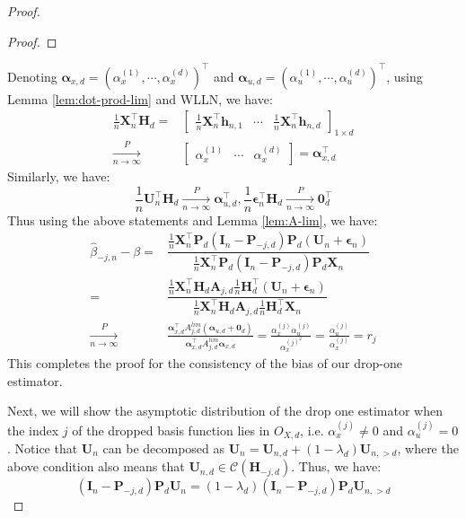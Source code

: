 \documentclass[
  12pt]{article}
\newcommand{\pnlim}{\xrightarrow[n \to \infty]{P}}
\newcommand{\bX}{\boldsymbol{X}}
\newcommand{\bh}{\boldsymbol{h}}
\newcommand{\balp}{\boldsymbol{\alpha}}
\newcommand{\bA}{\boldsymbol{A}}
\newcommand{\bU}{\boldsymbol{U}}
\newcommand{\bP}{\boldsymbol{P}}
\newcommand{\bI}{\boldsymbol{I}}
\newcommand{\beps}{\boldsymbol{\epsilon}}
\newcommand{\colsp}{\mathscr{C}}
\newcommand{\bH}{\boldsymbol{H}}
\newcommand{\bzero}{\boldsymbol{0}}
\begin{document}
\begin{proof}
\begin{proof}
\end{proof}
Denoting $\balp_{x,d} = \left(\alpha^{(1)}_{x}, \cdots, \alpha^{(d)}_{x}\right)^\top$ and $\balp_{u,d} = \left(\alpha^{(1)}_{u}, \cdots, \alpha^{(d)}_{u}\right)^\top$, using Lemma \ref{lem:dot-prod-lim} and WLLN, we have:
\begin{equation}\label{eq:X-Hk-inner}
    \begin{split}
           \frac{1}{n}\bX_n^\top\bH_d = & \begin{bmatrix}
        \frac{1}{n}\bX_n^\top\bh_{n,1} & \cdots & \frac{1}{n}\bX_n^\top\bh_{n,d}
    \end{bmatrix}_{1 \times d}\\
    \pnlim & \begin{bmatrix}
        \alpha_x^{(1)} & \cdots & \alpha_x^{(d)}
    \end{bmatrix} = \balp_{x,d}^\top
    \end{split}
\end{equation}
Similarly, we have:
$$
    \frac{1}{n}\bU_n^\top\bH_d \pnlim\balp_{u,d}^\top, \frac{1}{n}\beps_n^\top\bH_d \pnlim\bzero_{d}^\top
$$
Thus using the above statements and Lemma \ref{lem:A-lim}, we have:
\begin{equation}
    \begin{split}
        \hat{\beta}_{-j,n} - \beta = &\dfrac{\frac{1}{n}{\bX}_{n}^\top\bP_d(\bI_n - \bP_{-j,d})\bP_d(\bU_n + \beps_n)}{\frac{1}{n}{\bX}_{n}^\top\bP_d(\bI_n - \bP_{-j,d})\bP_d\bX_{n}}\\
        = & \dfrac{\frac{1}{n}{\bX}_{n}^\top\bH_{d} \bA_{j,d}\frac{1}{n}{\bH}_{d}^\top(\bU_n + \beps_n)}{\frac{1}{n}{\bX}_{n}^\top\bH_{d} \bA_{j,d}\frac{1}{n}{\bH}_{d}^\top\bX_{n}}\\
        \pnlim & \frac{\balp_{x,d}^\top A^{lim}_{j,d}(\balp_{u,d} + \bzero_d)}{{\balp}_{x,d}^\top A^{lim}_{j,d}\balp_{x,d}} = \frac{\alpha_x^{(j)}\alpha_u^{(j)}}{\alpha_x^{(j)^2}} = \frac{\alpha_u^{(j)}}{\alpha_x^{(j)}} = r_j
    \end{split}
\end{equation}
This completes the proof for the consistency of the bias of our drop-one estimator. 

Next, we will show the asymptotic distribution of the drop one estimator when the index $j$ of the dropped basis function lies in $O_{X,d}$, i.e. $\alpha_x^{(j)} \neq 0$ and $\alpha_u^{(j)} = 0$. Notice that $\bU_n$ can be decomposed as $\bU_n = \bU_{n,d} + (1 - \lambda_{d})\bU_{n,>d}$, where the above condition also means that $\bU_{n,d} \in \colsp(\bH_{-j,d})$. Thus, we have:
\begin{equation}\label{eq:projn-orth}
    (\bI_n- \bP_{-j,d})\bP_d\bU_n = (1 - \lambda_{d})(\bI_n- \bP_{-j,d})\bP_d\bU_{n,>d}
\end{equation}


\end{proof}
\end{document}
